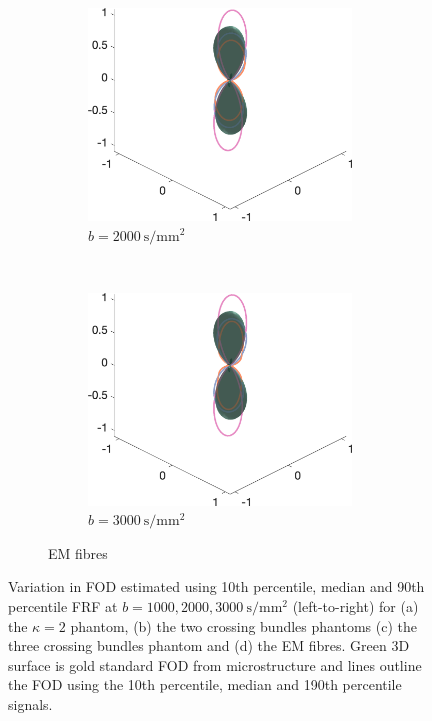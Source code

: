 \begin{figure}
\begin{subfigure}[]{\textwidth}
\begin{subfigure}[]{0.32\textwidth}
    \includegraphics[width=\textwidth]{figures/frf_experiment/EMfibres_fod_3D_b_2000n_4}
    \caption*{$b=\SI{2000}{\second\per\milli\metre\squared}$}
  \end{subfigure}
  ~
  \begin{subfigure}[]{0.32\textwidth}
    \includegraphics[width=\textwidth]{figures/frf_experiment/EMfibres_fod_3D_b_3000n_4}
    \caption*{$b=\SI{3000}{\second\per\milli\metre\squared}$}
  \end{subfigure}
  \caption{EM fibres}
  \end{subfigure}
  \caption[Variation in \acs{FOD} estimated at $b = 1000,2000,\SI{3000}{\second\per\milli\metre\squared}$]{Variation in \ac{FOD} estimated using 10th percentile, median and 90th percentile \ac{FRF} at $b = 1000,2000,\SI{3000}{\second\per\milli\metre\squared}$ (left-to-right) for (a) the $\kappa=2$ phantom, (b) the two crossing bundles phantoms  (c) the three crossing bundles phantom and (d) the EM fibres. Green 3D surface is gold standard \ac{FOD} from microstructure and lines outline the \ac{FOD} using the 10th percentile, median and 190th percentile signals. }
  \label{fig:frf_fod_b123}
\end{figure}

